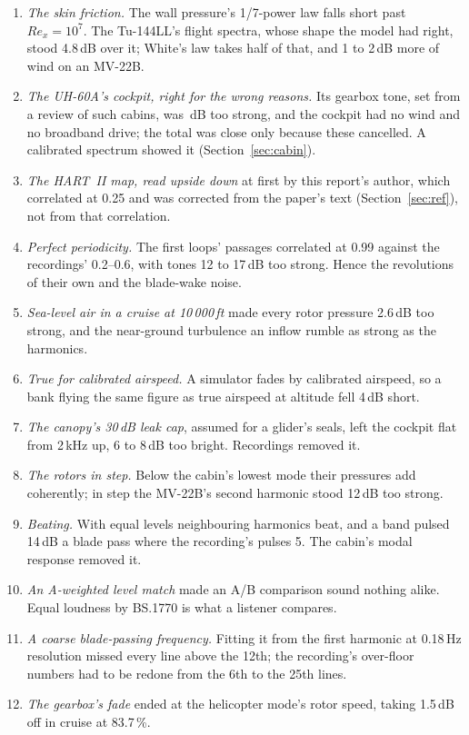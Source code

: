 \documentclass[10pt,a4paper,twocolumn]{article}
\begin{document}
\begin{enumerate}
\item \emph{The skin friction.} The wall pressure's 1/7-power law falls short past $Re_x=10^7$. The Tu-144LL's flight spectra, whose shape the model had right, stood 4.8\,dB over it; White's law takes half of that, and 1 to 2\,dB more of wind on an MV-22B.
\item \emph{The UH-60A's cockpit, right for the wrong reasons.} Its gearbox tone, set from a review of such cabins, was \NCkOldTone\,dB too strong, and the cockpit had no wind and no broadband drive; the total was close only because these cancelled. A calibrated spectrum showed it (Section~\ref{sec:cabin}).
\item \emph{The HART~II map, read upside down} at first by this report's author, which correlated at 0.25 and was corrected from the paper's text (Section~\ref{sec:ref}), not from that correlation.
\item \emph{Perfect periodicity.} The first loops' passages correlated at 0.99 against the recordings' 0.2--0.6, with tones 12 to 17\,dB too strong. Hence the revolutions of their own and the blade-wake noise.
\item \emph{Sea-level air in a cruise at 10\,000\,ft} made every rotor pressure 2.6\,dB too strong, and the near-ground turbulence an inflow rumble as strong as the harmonics.
\item \emph{True for calibrated airspeed.} A simulator fades by calibrated airspeed, so a bank flying the same figure as true airspeed at altitude fell 4\,dB short.
\item \emph{The canopy's 30\,dB leak cap}, assumed for a glider's seals, left the cockpit flat from 2\,kHz up, 6 to 8\,dB too bright. Recordings removed it.
\item \emph{The rotors in step.} Below the cabin's lowest mode their pressures add coherently; in step the MV-22B's second harmonic stood 12\,dB too strong.
\item \emph{Beating.} With equal levels neighbouring harmonics beat, and a band pulsed 14\,dB a blade pass where the recording's pulses 5. The cabin's modal response removed it.
\item \emph{An A-weighted level match} made an A/B comparison sound nothing alike. Equal loudness by BS.1770 is what a listener compares.
\item \emph{A coarse blade-passing frequency.} Fitting it from the first harmonic at 0.18\,Hz resolution missed every line above the 12th; the recording's over-floor numbers had to be redone from the 6th to the 25th lines.
\item \emph{The gearbox's fade} ended at the helicopter mode's rotor speed, taking 1.5\,dB off in cruise at 83.7\,\%.
\end{enumerate}
\end{document}
